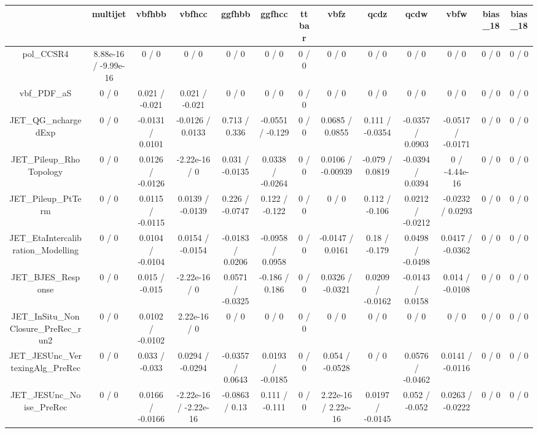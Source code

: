 \documentclass[10pt]{article}
\begin{document}
\begin{table}[htbp]
\begin{center}
\begin{tabular}{|c|c|c|c|c|c|c|c|c|c|c|c|c|}
\hline 
      & multijet      & vbfhbb      & vbfhcc      & ggfhbb      & ggfhcc      & ttbar      & vbfz      & qcdz      & qcdw      & vbfw      & bias_18      & bias_18 \\ 
\hline 
  pol_CCSR4 & 8.88e-16 / -9.99e-16 & 0 / 0 & 0 / 0 & 0 / 0 & 0 / 0 & 0 / 0 & 0 / 0 & 0 / 0 & 0 / 0 & 0 / 0 & 0 / 0 & 0 / 0 \\ 
  vbf_PDF_aS & 0 / 0 & 0.021 / -0.021 & 0.021 / -0.021 & 0 / 0 & 0 / 0 & 0 / 0 & 0 / 0 & 0 / 0 & 0 / 0 & 0 / 0 & 0 / 0 & 0 / 0 \\ 
  JET_QG_nchargedExp & 0 / 0 & -0.0131 / 0.0101 & -0.0126 / 0.0133 & 0.713 / 0.336 & -0.0551 / -0.129 & 0 / 0 & 0.0685 / 0.0855 & 0.111 / -0.0354 & -0.0357 / 0.0903 & -0.0517 / -0.0171 & 0 / 0 & 0 / 0 \\ 
  JET_Pileup_RhoTopology & 0 / 0 & 0.0126 / -0.0126 & -2.22e-16 / 0 & 0.031 / -0.0135 & 0.0338 / -0.0264 & 0 / 0 & 0.0106 / -0.00939 & -0.079 / 0.0819 & -0.0394 / 0.0394 & 0 / -4.44e-16 & 0 / 0 & 0 / 0 \\ 
  JET_Pileup_PtTerm & 0 / 0 & 0.0115 / -0.0115 & 0.0139 / -0.0139 & 0.226 / -0.0747 & 0.122 / -0.122 & 0 / 0 & 0 / 0 & 0.112 / -0.106 & 0.0212 / -0.0212 & -0.0232 / 0.0293 & 0 / 0 & 0 / 0 \\ 
  JET_EtaIntercalibration_Modelling & 0 / 0 & 0.0104 / -0.0104 & 0.0154 / -0.0154 & -0.0183 / 0.0206 & -0.0958 / 0.0958 & 0 / 0 & -0.0147 / 0.0161 & 0.18 / -0.179 & 0.0498 / -0.0498 & 0.0417 / -0.0362 & 0 / 0 & 0 / 0 \\ 
  JET_BJES_Response & 0 / 0 & 0.015 / -0.015 & -2.22e-16 / 0 & 0.0571 / -0.0325 & -0.186 / 0.186 & 0 / 0 & 0.0326 / -0.0321 & 0.0209 / -0.0162 & -0.0143 / 0.0158 & 0.014 / -0.0108 & 0 / 0 & 0 / 0 \\ 
  JET_InSitu_NonClosure_PreRec_run2 & 0 / 0 & 0.0102 / -0.0102 & 2.22e-16 / 0 & 0 / 0 & 0 / 0 & 0 / 0 & 0 / 0 & 0 / 0 & 0 / 0 & 0 / 0 & 0 / 0 & 0 / 0 \\ 
  JET_JESUnc_VertexingAlg_PreRec & 0 / 0 & 0.033 / -0.033 & 0.0294 / -0.0294 & -0.0357 / 0.0643 & 0.0193 / -0.0185 & 0 / 0 & 0.054 / -0.0528 & 0 / 0 & 0.0576 / -0.0462 & 0.0141 / -0.0116 & 0 / 0 & 0 / 0 \\ 
  JET_JESUnc_Noise_PreRec & 0 / 0 & 0.0166 / -0.0166 & -2.22e-16 / -2.22e-16 & -0.0863 / 0.13 & 0.111 / -0.111 & 0 / 0 & 2.22e-16 / 2.22e-16 & 0.0197 / -0.0145 & 0.052 / -0.052 & 0.0263 / -0.0222 & 0 / 0 & 0 / 0 \\ 

\end{tabular}
\end{center}
\end{table}
\end{document}
